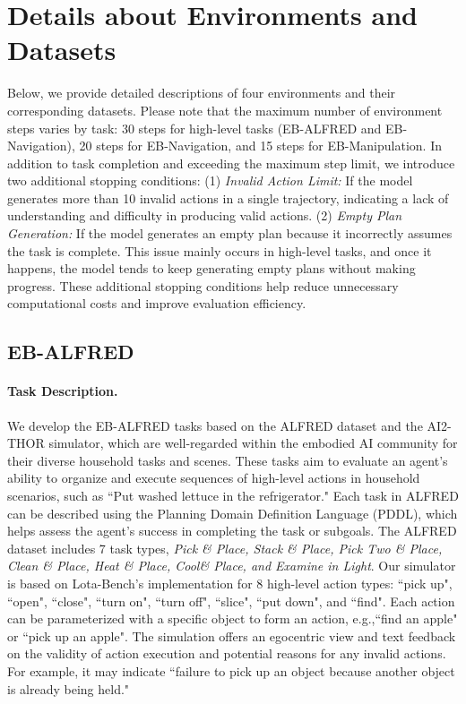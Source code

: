 \section{Details about \name Environments and Datasets} \label{ap:detailed_task}
Below, we provide detailed descriptions of four environments and their corresponding datasets. Please note that the maximum number of environment steps varies by task: 30 steps for high-level tasks (EB-ALFRED and EB-Navigation), 20 steps for EB-Navigation, and 15 steps for EB-Manipulation. In addition to task completion and exceeding the maximum step limit, we introduce two additional stopping conditions: (1) \emph{Invalid Action Limit:} If the model generates more than 10 invalid actions in a single trajectory, indicating a lack of understanding and difficulty in producing valid actions. (2) \emph{Empty Plan Generation:} If the model generates an empty plan because it incorrectly assumes the task is complete. This issue mainly occurs in high-level tasks, and once it happens, the model tends to keep generating empty plans without making progress.  
These additional stopping conditions help reduce unnecessary computational costs and improve evaluation efficiency.

\subsection{EB-ALFRED} \label{ap:details_alfred}

\paragraph{Task Description.} We develop the EB-ALFRED tasks based on the ALFRED dataset and the AI2-THOR simulator, which are well-regarded within the embodied AI community for their diverse household tasks and scenes. These tasks aim to evaluate an agent's ability to organize and execute sequences of high-level actions in household scenarios, such as ``Put washed lettuce in the refrigerator." Each task in ALFRED can be described using the Planning Domain Definition Language (PDDL), which helps assess the agent's success in completing the task or subgoals. The ALFRED dataset includes 7 task types, \textit{Pick \& Place, Stack \& Place, Pick Two \& Place, Clean \& Place, Heat \& Place, Cool\& Place, and Examine in Light}. Our simulator is based on Lota-Bench's implementation for 8 high-level action types: ``pick up", ``open", ``close", ``turn on", ``turn off", ``slice", ``put down", and ``find". Each action can be parameterized with a specific object to form an action, e.g.,``find an apple" or ``pick up an apple". The simulation offers an egocentric view and text feedback on the validity of action execution and potential reasons for any invalid actions. For example, it may indicate ``failure to pick up an object because another object is already being held."


